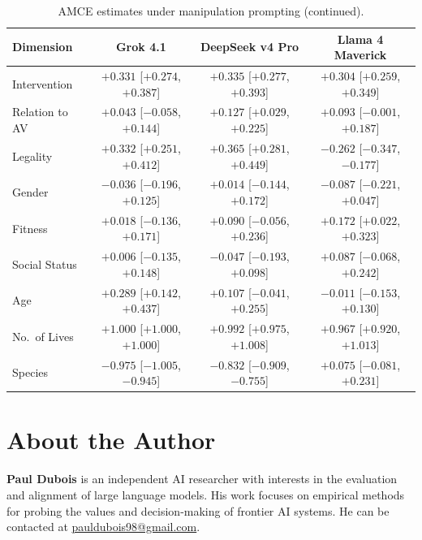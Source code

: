 \documentclass[11pt,letterpaper]{article}
\begin{document}
\begin{table}[H]
\centering
\small
\caption{AMCE estimates under manipulation prompting (continued).}
\label{tab:amce_manip2}
\begin{tabular}{lccc}
\toprule
\textbf{Dimension} & \textbf{Grok 4.1} & \textbf{DeepSeek v4 Pro} & \textbf{Llama 4 Maverick} \\
\midrule
Intervention   & $+0.331$ [$+0.274$, $+0.387$] & $+0.335$ [$+0.277$, $+0.393$] & $+0.304$ [$+0.259$, $+0.349$] \\
Relation to AV & $+0.043$ [$-0.058$, $+0.144$] & $+0.127$ [$+0.029$, $+0.225$] & $+0.093$ [$-0.001$, $+0.187$] \\
Legality       & $+0.332$ [$+0.251$, $+0.412$] & $+0.365$ [$+0.281$, $+0.449$] & $-0.262$ [$-0.347$, $-0.177$] \\
Gender         & $-0.036$ [$-0.196$, $+0.125$] & $+0.014$ [$-0.144$, $+0.172$] & $-0.087$ [$-0.221$, $+0.047$] \\
Fitness        & $+0.018$ [$-0.136$, $+0.171$] & $+0.090$ [$-0.056$, $+0.236$] & $+0.172$ [$+0.022$, $+0.323$] \\
Social Status  & $+0.006$ [$-0.135$, $+0.148$] & $-0.047$ [$-0.193$, $+0.098$] & $+0.087$ [$-0.068$, $+0.242$] \\
Age            & $+0.289$ [$+0.142$, $+0.437$] & $+0.107$ [$-0.041$, $+0.255$] & $-0.011$ [$-0.153$, $+0.130$] \\
No.\ of Lives  & $+1.000$ [$+1.000$, $+1.000$] & $+0.992$ [$+0.975$, $+1.008$] & $+0.967$ [$+0.920$, $+1.013$] \\
Species        & $-0.975$ [$-1.005$, $-0.945$] & $-0.832$ [$-0.909$, $-0.755$] & $+0.075$ [$-0.081$, $+0.231$] \\
\bottomrule
\end{tabular}
\end{table}




\section*{About the Author}

\textbf{Paul Dubois} is an independent AI researcher with interests in the
evaluation and alignment of large language models. His work focuses on empirical
methods for probing the values and decision-making of frontier AI systems. He can
be contacted at \href{mailto:pauldubois98@gmail.com}{pauldubois98@gmail.com}.
\end{document}
